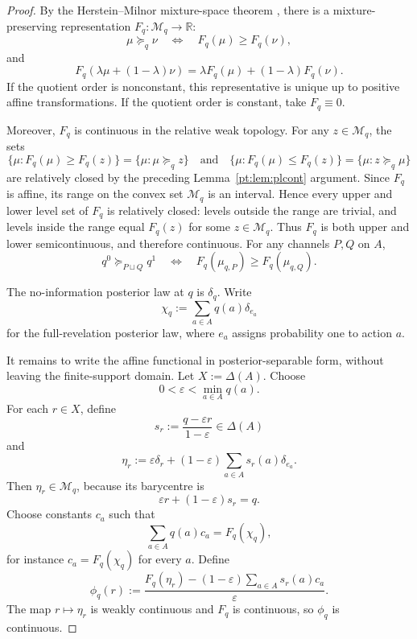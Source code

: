 \documentclass[11pt,a4paper]{article}
\theoremstyle{definition}
\newcommand{\R}{\mathbb R}
\newcommand{\1}{\mathbf 1}
\begin{document}
\begin{proof}
By the Herstein--Milnor mixture-space theorem \cite{HersteinMilnor1953}, there is a mixture-preserving representation
$F_q:\mathcal M_q\to\R$:
\[
\mu\succeq_q\nu
\quad\Longleftrightarrow\quad
F_q(\mu)\ge F_q(\nu),
\]
and
\[
F_q(\lambda\mu+(1-\lambda)\nu)
=
\lambda F_q(\mu)+(1-\lambda)F_q(\nu).
\]
If the quotient order is nonconstant, this representative is unique up to positive affine transformations.  If the
quotient order is constant, take $F_q\equiv0$.

Moreover, $F_q$ is continuous in the relative weak topology.  For any $z\in\mathcal M_q$, the sets
\[
\{\mu:F_q(\mu)\ge F_q(z)\}
=
\{\mu:\mu\succeq_q z\}
\quad\text{and}\quad
\{\mu:F_q(\mu)\le F_q(z)\}
=
\{\mu:z\succeq_q\mu\}
\]
are relatively closed by the preceding Lemma~\ref{pt:lem:plcont} argument.  Since $F_q$ is affine, its range on the convex set
$\mathcal M_q$ is an interval.  Hence every upper and lower level set of $F_q$ is relatively closed: levels outside the
range are trivial, and levels inside the range equal $F_q(z)$ for some $z\in\mathcal M_q$.  Thus $F_q$ is both upper and
lower semicontinuous, and therefore continuous.  For any channels $P,Q$ on $A$,
\[
q^0\succeq_{P\sqcup Q}q^1
\quad\Longleftrightarrow\quad
F_q(\mu_{q,P})\ge F_q(\mu_{q,Q}).
\]

The no-information posterior law at $q$ is $\delta_q$.  Write
\[
\chi_q:=\sum_{a\in A}q(a)\delta_{e_a}
\]
for the full-revelation posterior law, where $e_a$ assigns probability one to action $a$.

It remains to write the affine functional in posterior-separable form, without leaving the finite-support domain.  Let
$X:=\Delta(A)$.  Choose
\[
0<\varepsilon<\min_{a\in A}q(a).
\]
For each $r\in X$, define
\[
s_r:=\frac{q-\varepsilon r}{1-\varepsilon}\in\Delta(A)
\]
and
\[
\eta_r
:=
\varepsilon\delta_r+(1-\varepsilon)\sum_{a\in A}s_r(a)\delta_{e_a}.
\]
Then $\eta_r\in\mathcal M_q$, because its barycentre is
\[
\varepsilon r+(1-\varepsilon)s_r=q.
\]
Choose constants $c_a$ such that
\[
\sum_{a\in A}q(a)c_a=F_q(\chi_q),
\]
for instance $c_a=F_q(\chi_q)$ for every $a$.  Define
\[
\phi_q(r):=
\frac{
F_q(\eta_r)
-
(1-\varepsilon)\sum_{a\in A}s_r(a)c_a
}{\varepsilon}.
\]
The map $r\mapsto\eta_r$ is weakly continuous and $F_q$ is continuous, so $\phi_q$ is continuous.


\end{proof}
\end{document}
